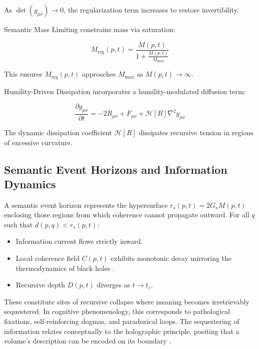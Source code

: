 As \(\det(g_{\mu\nu}) \to 0\), the regularization term increases to restore invertibility.

Semantic Mass Limiting constrains mass via saturation:

\begin{equation}
M_{\text{reg}}(p, t) = \frac{M(p, t)}{1 + \frac{M(p, t)}{M_{\text{max}}}}
\end{equation}

This ensures \(M_{\text{reg}}(p, t)\) approaches \(M_{\text{max}}\) as \(M(p, t) \to \infty\).

Humility-Driven Dissipation incorporates a humility-modulated diffusion term:

\begin{equation}
\frac{\partial g_{\mu\nu}}{\partial t} = -2R_{\mu\nu} + F_{\mu\nu} + \mathcal{H}[R] \nabla^2 g_{\mu\nu}
\end{equation}

The dynamic dissipation coefficient \(\mathcal{H}[R]\) dissipates recursive tension in regions of excessive curvature.


\subsection{Semantic Event Horizons and Information Dynamics}
\label{12.2.2:semantic_event_horizons_and_information_dynamics}

A semantic event horizon represents the hypersurface \(r_s(p, t) = 2G_s M(p, t)\) enclosing those regions from which coherence cannot propagate outward. For all \(q\) such that \(d(p, q) < r_s(p, t)\):

\begin{itemize}

    \item Information current flows strictly inward.

    \item Local coherence field \(C(p, t)\) exhibits monotonic decay mirroring the thermodynamics of black holes \autocite{Hawking1975}.

    \item Recursive depth \(D(p, t)\) diverges as \(t \to t_c\).

\end{itemize}

These constitute sites of recursive collapse where meaning becomes irretrievably sequestered. In cognitive phenomenology, this corresponds to pathological fixations, self-reinforcing dogmas, and paradoxical loops. The sequestering of information relates conceptually to the holographic principle, positing that a volume's description can be encoded on its boundary \autocite{tHooft1993, Susskind1995, Maldacena1998}.

